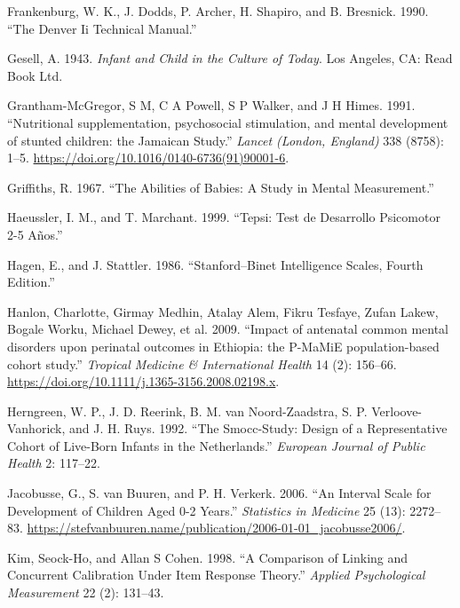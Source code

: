 \documentclass[
]{book}
\begin{document}
\leavevmode\hypertarget{ref-frankenburg1990}{}%
Frankenburg, W. K., J. Dodds, P. Archer, H. Shapiro, and B. Bresnick. 1990. ``The Denver Ii Technical Manual.''

\leavevmode\hypertarget{ref-gesell1943}{}%
Gesell, A. 1943. \emph{Infant and Child in the Culture of Today}. Los Angeles, CA: Read Book Ltd.

\leavevmode\hypertarget{ref-Grantham-McGregor1991}{}%
Grantham-McGregor, S M, C A Powell, S P Walker, and J H Himes. 1991. ``Nutritional supplementation, psychosocial stimulation, and mental development of stunted children: the Jamaican Study.'' \emph{Lancet (London, England)} 338 (8758): 1--5. \url{https://doi.org/10.1016/0140-6736(91)90001-6}.

\leavevmode\hypertarget{ref-griffiths1967}{}%
Griffiths, R. 1967. ``The Abilities of Babies: A Study in Mental Measurement.''

\leavevmode\hypertarget{ref-haeussler1999}{}%
Haeussler, I. M., and T. Marchant. 1999. ``Tepsi: Test de Desarrollo Psicomotor 2-5 Años.''

\leavevmode\hypertarget{ref-hagen1986}{}%
Hagen, E., and J. Stattler. 1986. ``Stanford--Binet Intelligence Scales, Fourth Edition.''

\leavevmode\hypertarget{ref-Hanlon2009}{}%
Hanlon, Charlotte, Girmay Medhin, Atalay Alem, Fikru Tesfaye, Zufan Lakew, Bogale Worku, Michael Dewey, et al. 2009. ``Impact of antenatal common mental disorders upon perinatal outcomes in Ethiopia: the P-MaMiE population-based cohort study.'' \emph{Tropical Medicine \& International Health} 14 (2): 156--66. \url{https://doi.org/10.1111/j.1365-3156.2008.02198.x}.

\leavevmode\hypertarget{ref-herngreen1992}{}%
Herngreen, W. P., J. D. Reerink, B. M. van Noord-Zaadstra, S. P. Verloove-Vanhorick, and J. H. Ruys. 1992. ``The Smocc-Study: Design of a Representative Cohort of Live-Born Infants in the Netherlands.'' \emph{European Journal of Public Health} 2: 117--22.

\leavevmode\hypertarget{ref-jacobusse2006}{}%
Jacobusse, G., S. van Buuren, and P. H. Verkerk. 2006. ``An Interval Scale for Development of Children Aged 0-2 Years.'' \emph{Statistics in Medicine} 25 (13): 2272--83. \url{https://stefvanbuuren.name/publication/2006-01-01_jacobusse2006/}.

\leavevmode\hypertarget{ref-kim1998}{}%
Kim, Seock-Ho, and Allan S Cohen. 1998. ``A Comparison of Linking and Concurrent Calibration Under Item Response Theory.'' \emph{Applied Psychological Measurement} 22 (2): 131--43.
\end{document}
